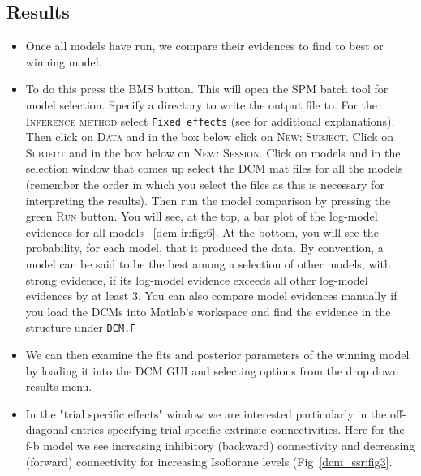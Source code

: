 \subsection{Results}

\begin{itemize}
\item Once all models have run, we compare their evidences to find to best or winning model.
\item To do this press the \textsc{BMS} button. This will open the SPM batch tool for model selection. Specify a directory to write the output file to.  For the \textsc{Inference method} select \texttt{Fixed effects} (see \cite{klaas_bms} for additional explanations). Then click on \textsc{Data} and in the box below click on \textsc{New: Subject}. Click on \textsc{Subject} and in the box below on \textsc{New: Session}. Click on models and in the selection window that comes up select the DCM mat files for all the models (remember the order in which you select the files as this is necessary for interpreting the results). Then run the model comparison by pressing the green \textsc{Run} button. You will see, at the top, a bar plot of the log-model evidences for all models ~\ref{dcm-ir:fig:6}. At the bottom, you will see the probability, for each model, that it produced the data. By convention, a model can be said to be the best among a selection of other models, with strong evidence, if its log-model evidence exceeds all other log-model evidences by at least 3. You can also compare model evidences manually if you load the DCMs into Matlab's workspace and find the evidence in the structure under \texttt{DCM.F}
\item We can then examine the fits and posterior parameters of the winning model by loading it into the DCM GUI and selecting options from the drop down results menu.
\item In the "trial specific effects" window we are interested particularly in the off-diagonal entries specifying trial specific extrinsic connectivities. Here for the f-b model we see increasing inhibitory (backward) connectivity and decreasing (forward) connectivity for increasing Isoflorane levels (Fig~\ref{dcm_ssr:fig3}. 
\end{itemize}

